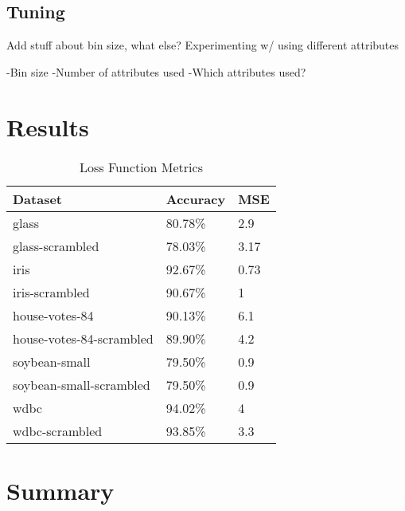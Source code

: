 \documentclass[twoside,11pt]{article}
\begin{document}
\subsection{Tuning}

Add stuff about bin size, what else? \newline
Experimenting w/ using different attributes

-Bin size \newline
-Number of attributes used \newline
-Which attributes used? \newline

\section{Results}

\begin{table}[h]
	\centering
	\caption{Loss Function Metrics} \label{tab:metrics}
	\begin{tabular}{|l|l|l|}
		\hline
		Dataset                  & Accuracy & MSE  \\ \hline
		glass                    & 80.78\%  & 2.9  \\ \hline
		glass-scrambled          & 78.03\%  & 3.17 \\ \hline
		iris                     & 92.67\%  & 0.73 \\ \hline
		iris-scrambled           & 90.67\%  & 1    \\ \hline
		house-votes-84           & 90.13\%  & 6.1  \\ \hline
		house-votes-84-scrambled & 89.90\%  & 4.2  \\ \hline
		soybean-small            & 79.50\%  & 0.9  \\ \hline
		soybean-small-scrambled  & 79.50\%  & 0.9  \\ \hline
		wdbc                     & 94.02\%  & 4    \\ \hline
		wdbc-scrambled           & 93.85\%  & 3.3  \\ \hline
	\end{tabular}
\end{table}

\section{Summary}


\end{document}
